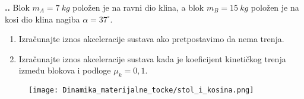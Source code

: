 

\noindent 
\textbf{
\thecjelina.\thezadatak.}
Blok $m_A = 7\ kg$ položen je na ravni dio klina, a blok $m_B = 15\ kg$ polo\v{z}en je na kosi dio
klina nagiba $\alpha = 37^\circ$.
\begin{enumerate}[label=\alph*)]
 \item Izra\v{c}unajte iznos akceleracije sustava ako pretpostavimo da nema trenja.
 \item Izra\v{c}unajte iznos akceleracije sustava kada je koeficijent kineti\v{c}kog trenja između
blokova i podloge \(\mu_k = 0,1\).
\end{enumerate}
\begin{figure}[h]%
  \begin{center}
    \texttt{[image: Dinamika\_materijalne\_tocke/stol\_i\_kosina.png]}
  \end{center}
\end{figure}

